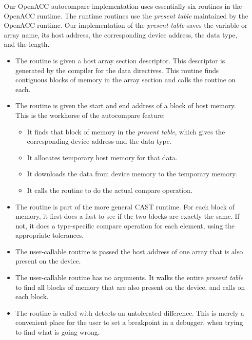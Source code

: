 Our OpenACC autocompare implementation uses essentially six routines in the OpenACC runtime.
The runtime routines use the \emph{present table}\cite{wolfe.ashes.17} maintained by the OpenACC runtime.
Our implementation of the \emph{present table} saves the variable or array name, its host address, the corresponding device address, the data type, and the length.
\begin{itemize}
\item The  routine is given a host array section descriptor.
This descriptor is generated by the compiler for the data directives.
This routine finds contiguous blocks of memory in the array section and calls the  routine on each.
\item The  routine is given the start and end address of a block of host memory.
This is the workhorse of the autocompare feature:
\begin{itemize}
\item It finds that block of memory in the \emph{present table}, which gives the corresponding device address and the data type.
\item It allocates temporary host memory for that data.
\item It downloads the data from device memory to the temporary memory.
\item It calls the  routine to do the actual compare operation.
\end{itemize}
\item The  routine is part of the more general CAST runtime.
For each block of memory, it first does a fast  to see if the two blocks are exactly the same.
If not, it does a type-specific compare operation for each element, using the appropriate tolerances.

\item The user-callable  routine is passed the host address of one array that is also present on the device.
\item The user-callable  routine has no arguments.
It walks the entire \emph{present table} to find all blocks of memory that are also present on the device, and calls  on each block.
\item The  routine is called with  detects an untolerated difference.
This is merely a convenient place for the user to set a breakpoint in a debugger, when trying to find what is going wrong.
\end{itemize}

